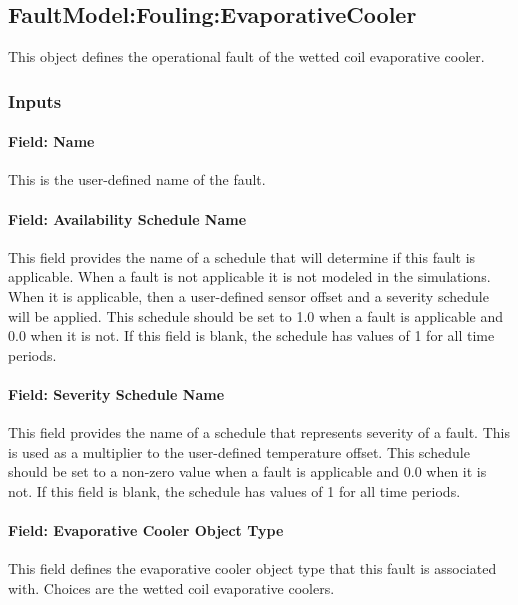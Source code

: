 \subsection{FaultModel:Fouling:EvaporativeCooler}\label{faultmodelfoulingevapcooler}

This object defines the operational fault of the wetted coil evaporative cooler.

\subsubsection{Inputs}

\paragraph{Field: Name}

This is the user-defined name of the fault.

\paragraph{Field: Availability Schedule Name}

This field provides the name of a schedule that will determine if this fault is applicable. When a fault is not applicable it is not modeled in the simulations. When it is applicable, then a user-defined sensor offset and a severity schedule will be applied. This schedule should be set to 1.0 when a fault is applicable and 0.0 when it is not. If this field is blank, the schedule has values of 1 for all time periods.

\paragraph{Field: Severity Schedule Name}\label{field-severity-schedule-name}

This field provides the name of a schedule that represents severity of a fault. This is used as a multiplier to the user-defined temperature offset. This schedule should be set to a non-zero value when a fault is applicable and 0.0 when it is not. If this field is blank, the schedule has values of 1 for all time periods.

\paragraph{Field: Evaporative Cooler Object Type}\label{field-evaporative cooler-object-type}

This field defines the evaporative cooler object type that this fault is associated with. Choices are the wetted coil evaporative coolers.

